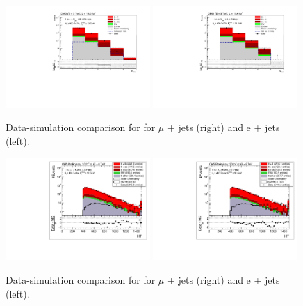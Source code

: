 \begin{figure}[ht!]
\centering
    \includegraphics[width=0.49\textwidth]{images/Run1/NbOfSelectedBJets_mu.pdf}
     \includegraphics[width=0.49\textwidth]{images/Run1/NbOfSelectedBJets_e.pdf}        
    \caption{Data-simulation comparison for \nbtags for $\mu$ + jets (right) and e + jets (left).}
    \label{fig:datasimnbtags}
\end{figure}

\begin{figure}[ht!]
\centering
    \includegraphics[width=0.49\textwidth]{images/Run1/HT_SelectedJets_StackLogY_Mu.pdf}
     \includegraphics[width=0.49\textwidth]{images/Run1/HT_SelectedJets_StackLogY_e.pdf}          
    \caption{Data-simulation comparison for \HT for $\mu$ + jets (right) and e + jets (left). }
    \label{fig:datasimHT}
\end{figure}

